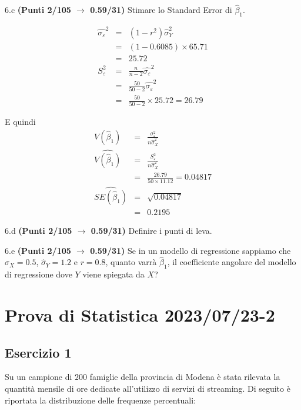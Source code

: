 \documentclass[
  11pt,
]{book}
\theoremstyle{mytheoremstyle}
\theoremstyle{mydefstyle}
\newenvironment{sol}
  {
  \begin{tcolorbox}[enhanced,breakable,arc=0.1mm,boxrule=1pt,colback=white,colframe=iblue,
  title=\bf \fontfamily{lmss}\selectfont \hspace{.5 cm} Soluzione,drop fuzzy shadow]

}{
\end{tcolorbox}
  }
\begin{document}
6.c \textbf{(Punti 2/105 \(\rightarrow\) 0.59/31)} Stimare lo Standard Error di \(\hat\beta_1\).

\begin{sol}
\begin{eqnarray*}
\hat{\sigma_\varepsilon}^2&=&(1-r^2)\hat\sigma_Y^2\\
&=& (1- 0.6085 )\times 65.71 \\
   &=&  25.72 \\
   S_\varepsilon^2 &=& \frac{n} {n-2} \hat{\sigma_\varepsilon}^2\\
   &=&  \frac{ 50 } { 50 -2} \hat{\sigma_\varepsilon}^2 \\
 &=&  \frac{ 50 } { 50 -2} \times  25.72  =  26.79  
\end{eqnarray*}

E quindi\begin{eqnarray*}
V(\hat\beta_{1}) &=& \frac{\sigma_{\varepsilon}^{2}} {n \hat{\sigma}^{2}_{X}} \\
\widehat{V(\hat\beta_{1})} &=& \frac{S_{\varepsilon}^{2}} {n \hat{\sigma}^{2}_{X}} \\
 &=& \frac{ 26.79 } { 50 \times  11.12 } =  0.04817 \\
 \widehat{SE(\hat\beta_{1})}        &=&  \sqrt{ 0.04817 }\\
 &=&  0.2195 
\end{eqnarray*}

\end{sol}

6.d \textbf{(Punti 2/105 \(\rightarrow\) 0.59/31)} Definire i punti di leva.

6.e \textbf{(Punti 2/105 \(\rightarrow\) 0.59/31)} Se in un modello di regressione sappiamo che \(\hat\sigma_X=0.5\), \(\hat\sigma_Y=1.2\) e \(r=0.8\), quanto varrà \(\hat\beta_1\), il coefficiente angolare del modello di regressione dove \(Y\) viene spiegata da \(X\)?

\section{Prova di Statistica 2023/07/23-2}\label{prova-di-statistica-20230723-2}

\subsection{Esercizio 1}\label{esercizio-1-32}

Su un campione di \(200\) famiglie della provincia di Modena è stata rilevata la quantità mensile di ore dedicate all'utilizzo di servizi di streaming. Di seguito è riportata la distribuzione delle frequenze percentuali:
\end{document}
